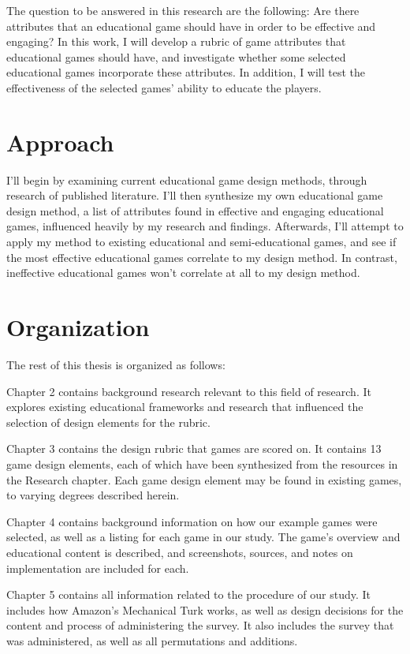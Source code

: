 \documentclass[12pt]{report}
\begin{document}
		The question to be answered in this research are the following: Are there attributes that an educational game should have in order to be effective and engaging? In this work, I will develop a rubric of game attributes that educational games should have, and investigate whether some selected educational games incorporate these attributes. In addition, I will test the effectiveness of the selected games' ability to educate the players.

	\section{Approach} 
		I'll begin by examining current educational game design methods, through research of published literature. I'll then synthesize my own educational game design method, a list of attributes found in effective and engaging educational games, influenced heavily by my research and findings. Afterwards, I'll attempt to apply my method to existing educational and semi-educational games, and see if the most effective educational games correlate to my design method. In contrast, ineffective educational games won't correlate at all to my design method.

	\section{Organization}
		The rest of this thesis is organized as follows:

		Chapter 2 contains background research relevant to this field of research. It explores existing educational frameworks and research that influenced the selection of design elements for the rubric.

		Chapter 3 contains the design rubric that games are scored on. It contains 13 game design elements, each of which have been synthesized from the resources in the Research chapter. Each game design element may be found in existing games, to varying degrees described herein.

		Chapter 4 contains background information on how our example games were selected, as well as a listing for each game in our study. The game's overview and educational content is described, and screenshots, sources, and notes on implementation are included for each.

		Chapter 5 contains all information related to the procedure of our study. It includes how Amazon's Mechanical Turk works, as well as design decisions for the content and process of administering the survey. It also includes the survey that was administered, as well as all permutations and additions.
\end{document}
